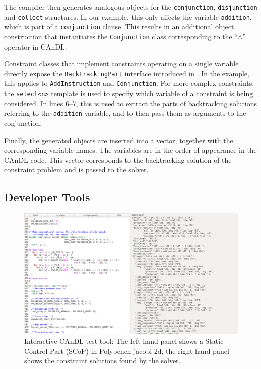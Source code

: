     The compiler then generates analogous objects for the
    \texttt{conjunction}, \texttt{disjunction} and \texttt{collect} structures.
    In our example, this only affects the variable \texttt{addition}, which is
    part of a \texttt{conjunction} clause.
    This results in an additional object construction that instantiates the
    \texttt{Conjunction} class corresponding to the ``$\land$'' operator
    in CAnDL.

    Constraint classes that implement constraints operating on a single
    variable directly expose the \texttt{BacktrackingPart} interface introduced
    in .
    In the example, this applies to \texttt{AddInstruction} and
    \texttt{Conjunction}.
    For more complex constraints, the \texttt{select<n>} template is used to
    specify which variable of a constraint is being considered.
    In lines 6--7, this is used to extract the parts of backtracking solutions
    referring to the \texttt{addition} variable, and to then pass them as
    arguments to the conjunction.

    Finally, the generated objects are inserted into a vector, together with the
    corresponding variable names.
    The variables are in the order of appearance in the CAnDL code.
    This vector corresponds to the backtracking solution of the constraint
    problem and is passed to the solver.

\subsection{Developer Tools}

\begin{figure}[t]
\centering
\includegraphics[width=\textwidth]{figures/visual_gui2.png}
\caption{Interactive CAnDL test tool: The left hand panel shows a Static Control
        Part (SCoP) in Polybench jacobi-2d, the right hand panel shows the
        constraint solutions found by the solver.}
\label{fig:gui}
\end{figure}

